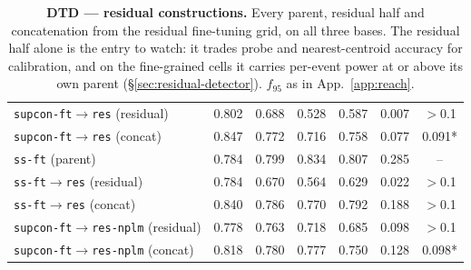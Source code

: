 \documentclass{article}
\begin{document}
\begin{table}[p]
\begin{tabular}{lcccccc}
\texttt{supcon-ft$\to$res} (residual) & 0.802 & 0.688 & 0.528 & 0.587 & 0.007 & $>$0.1 \\
\texttt{supcon-ft$\to$res} (concat) & 0.847 & 0.772 & 0.716 & 0.758 & 0.077 & 0.091* \\
\texttt{ss-ft} (parent) & 0.784 & 0.799 & 0.834 & 0.807 & 0.285 & -- \\
\texttt{ss-ft$\to$res} (residual) & 0.784 & 0.670 & 0.564 & 0.629 & 0.022 & $>$0.1 \\
\texttt{ss-ft$\to$res} (concat) & 0.840 & 0.786 & 0.770 & 0.792 & 0.188 & $>$0.1 \\
\texttt{supcon-ft$\to$res-nplm} (residual) & 0.778 & 0.763 & 0.718 & 0.685 & 0.098 & $>$0.1 \\
\texttt{supcon-ft$\to$res-nplm} (concat) & 0.818 & 0.780 & 0.777 & 0.750 & 0.128 & 0.098* \\
\bottomrule
\end{tabular}
\caption{\textbf{DTD --- residual constructions.} Every parent, residual half
and concatenation from the residual fine-tuning grid, on all three bases.
The residual half alone is the entry to watch: it trades probe and
nearest-centroid accuracy for calibration, and on the fine-grained cells it
carries per-event power at or above its own parent
(\S\ref{sec:residual-detector}). $f_{95}$ as in App.~\ref{app:reach}.}
\label{tab:res-dtd}
\end{table}
\end{document}
